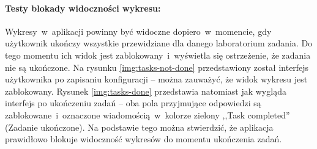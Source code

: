 


\paragraph{Testy blokady widoczności wykresu:} Wykresy~w~aplikacji powinny być widoczne
dopiero~w~momencie, gdy użytkownik ukończy wszystkie przewidziane dla danego laboratorium zadania.
Do tego momentu ich widok jest zablokowany~i~wyświetla się ostrzeżenie, że zadania nie są ukończone.
Na rysunku \ref{img:tasks-not-done} przedstawiony został interfejs użytkownika po zapisaniu
konfiguracji -- można zauważyć, że widok wykresu jest zablokowany. Rysunek \ref{img:tasks-done}
przedstawia natomiast jak wygląda interfejs po ukończeniu zadań -- oba pola przyjmujące odpowiedzi
są zablokowane~i~oznaczone wiadomością~w~kolorze zielony ,,Task completed'' (Zadanie ukończone). Na
podstawie tego można stwierdzić, że aplikacja prawidłowo blokuje widoczność wykresów do momentu
ukończenia zadań.

\begingroup
{}
\endgroup